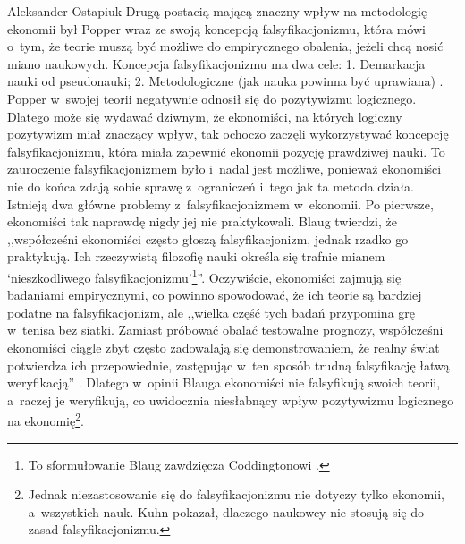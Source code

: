 \begin{artplenv}{Aleksander Ostapiuk}
Drugą postacią mającą znaczny wpływ na metodologię ekonomii był Popper wraz ze swoją koncepcją falsyfikacjonizmu, która
mówi o~tym, że teorie muszą być możliwe do empirycznego obalenia, jeżeli chcą nosić miano naukowych. Koncepcja
falsyfikacjonizmu ma dwa cele: 1. Demarkacja nauki od pseudonauki; 2. Metodologiczne (jak nauka powinna być uprawiana)
\parencite{hands_popper_1993}.
Popper w~swojej teorii negatywnie odnosił się do pozytywizmu logicznego.
Dlatego może się wydawać dziwnym, że ekonomiści, na których logiczny pozytywizm miał znaczący wpływ, tak ochoczo zaczęli
wykorzystywać koncepcję falsyfikacjonizmu, która miała zapewnić ekonomii pozycję prawdziwej nauki. To zauroczenie
falsyfikacjonizmem było i~nadal jest możliwe, ponieważ ekonomiści nie do końca zdają sobie sprawę z~ograniczeń i~tego
jak ta metoda działa. Istnieją dwa główne problemy z~falsyfikacjonizmem w~ekonomii. Po pierwsze, ekonomiści tak naprawdę
nigdy jej nie praktykowali. Blaug
\parencite*[s.~175]{blaug_metodologia_1995}
twierdzi, że ,,współcześni ekonomiści często
głoszą falsyfikacjonizm, jednak rzadko go praktykują. Ich rzeczywistą filozofię nauki określa się trafnie mianem
`nieszkodliwego falsyfikacjonizmu'\footnote{To sformułowanie Blaug zawdzięcza Coddingtonowi
\parencite[s.~542]{coddington_rationale_1975}.
}''.
Oczywiście, ekonomiści zajmują się badaniami empirycznymi, co powinno
spowodować, że ich teorie są bardziej podatne na falsyfikacjonizm, ale ,,wielka część tych badań przypomina grę w~tenisa
bez siatki. Zamiast próbować obalać testowalne prognozy, współcześni ekonomiści ciągle zbyt często zadowalają się
demonstrowaniem, że realny świat potwierdza ich przepowiednie, zastępując w~ten sposób trudną falsyfikację łatwą
weryfikacją''
\parencite[s.~348]{blaug_metodologia_1995}.
Dlatego w~opinii Blauga ekonomiści nie falsyfikują swoich
teorii, a~raczej je weryfikują, co uwidocznia niesłabnący wpływ pozytywizmu logicznego na ekonomię\footnote{Jednak
niezastosowanie się do falsyfikacjonizmu nie dotyczy tylko ekonomii, a~wszystkich nauk. Kuhn
\parencite*{kuhn_structure_1962}
pokazał, dlaczego naukowcy nie stosują się do zasad falsyfikacjonizmu.}. 


\end{artplenv}
